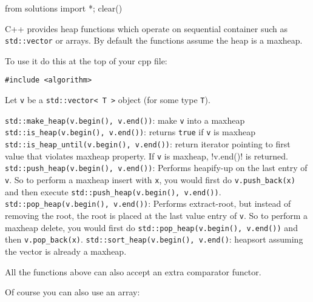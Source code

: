 \begin{python0}
from solutions import *; clear()
\end{python0}

C++ provides heap functions
which operate on sequential container such as \verb!std::vector!
or arrays.
By default the functions assume the heap is a maxheap.

To use it do this at the top of your cpp file:
\begin{Verbatim}[frame=single, fontsize=\small]
#include <algorithm>
\end{Verbatim}

Let \verb!v! be a \verb!std::vector< T >! object (for some type \verb!T!).
\begin{enumerate}[nosep]
  \li \verb!std::make_heap(v.begin(), v.end())!: make \verb!v! into a maxheap
  \li \verb!std::is_heap(v.begin(), v.end())!: returns \verb!true! if \verb!v! is maxheap
  \li \verb!std::is_heap_until(v.begin(), v.end())!:
  return iterator pointing to first value that violates maxheap property.
  If \verb!v! is maxheap, !v.end()! is returned.
  \li \verb!std::push_heap(v.begin(), v.end())!: Performs heapify-up on
  the last entry of \verb!v!.
  So to perform a maxheap insert with \verb!x!, you would first
  do \verb!v.push_back(x)! and then execute
  \verb!std::push_heap(v.begin(), v.end())!.
  \li \verb!std::pop_heap(v.begin(), v.end())!: Performs extract-root,
  but instead of removing the root,
  the root is placed at the last value entry of \verb!v!.
  So to perform a maxheap delete, you would first
  do \verb!std::pop_heap(v.begin(), v.end())!
  and then \verb!v.pop_back(x)!.
  \li \verb!std::sort_heap(v.begin(), v.end()!: heapsort assuming the
  vector is already a maxheap.
\end{enumerate}
All the functions above can also accept an extra comparator functor.

Of course you can also use an array:



